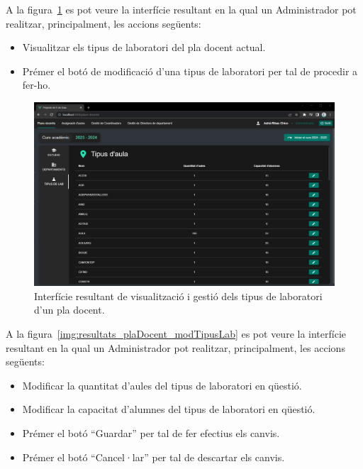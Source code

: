 \documentclass[a4paper,12pt]{ThesisStyle}
\begin{document}
\newpage

A la figura~\ref{img:resultats_plaDocent_tipusLab} es pot veure la interfície resultant en la qual un Administrador pot realitzar, principalment, les accions següents:
\begin{itemize}
  \item Visualitzar els tipus de laboratori del pla docent actual.
  \item Prémer el botó de modificació d'una tipus de laboratori per tal de procedir a fer-ho.
\end{itemize}

\begin{figure}[H]
  \centering
  \includegraphics[width=\textwidth]{assets/results/plaDocent/tipusLab.png}
  \caption{\label{img:resultats_plaDocent_tipusLab}Interfície resultant de visualització i gestió dels tipus de laboratori d'un pla docent.}
\end{figure}

\newpage

A la figura~\ref{img:resultats_plaDocent_modTipusLab} es pot veure la interfície resultant en la qual un Administrador pot realitzar, principalment, les accions següents:
\begin{itemize}
  \item Modificar la quantitat d'aules del tipus de laboratori en qüestió.
  \item Modificar la capacitat d'alumnes del tipus de laboratori en qüestió.
  \item Prémer el botó ``Guardar'' per tal de fer efectius els canvis.
  \item Prémer el botó ``Cancel·lar'' per tal de descartar els canvis.
\end{itemize}
\end{document}
